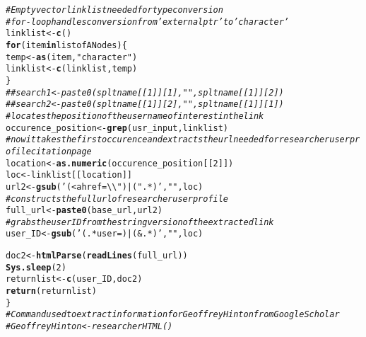 \documentclass{article}\usepackage[]{graphicx}\usepackage[]{color}
\makeatletter
\newcommand{\hlnum}[1]{\textcolor[rgb]{0.686,0.059,0.569}{#1}}%
\newcommand{\hlstr}[1]{\textcolor[rgb]{0.192,0.494,0.8}{#1}}%
\newcommand{\hlcom}[1]{\textcolor[rgb]{0.678,0.584,0.686}{\textit{#1}}}%
\newcommand{\hlstd}[1]{\textcolor[rgb]{0.345,0.345,0.345}{#1}}%
\newcommand{\hlkwa}[1]{\textcolor[rgb]{0.161,0.373,0.58}{\textbf{#1}}}%
\newcommand{\hlkwb}[1]{\textcolor[rgb]{0.69,0.353,0.396}{#1}}%
\newcommand{\hlkwd}[1]{\textcolor[rgb]{0.737,0.353,0.396}{\textbf{#1}}}%
\newenvironment{kframe}{%
 \def\at@end@of@kframe{}%
 \ifinner\ifhmode%
  \def\at@end@of@kframe{\end{minipage}}%
  \begin{minipage}{\columnwidth}%
 \fi\fi%
 \def\FrameCommand##1{\hskip\@totalleftmargin \hskip-\fboxsep
 \colorbox{shadecolor}{##1}\hskip-\fboxsep
     \hskip-\linewidth \hskip-\@totalleftmargin \hskip\columnwidth}%
 \MakeFramed {\advance\hsize-\width
   \@totalleftmargin\z@ \linewidth\hsize
   \@setminipage}}%
 {\par\unskip\endMakeFramed%
 \at@end@of@kframe}
\newenvironment{knitrout}{}{} %
\makeatother
\begin{document}
\begin{knitrout}
\begin{kframe}
\begin{alltt}
  \hlcom{#Empty vector linklist needed for type conversion}
  \hlcom{#for-loop handles conversion from 'externalptr' to 'character'}
  \hlstd{linklist}\hlkwb{<-}\hlkwd{c}\hlstd{()}
  \hlkwa{for} \hlstd{(item} \hlkwa{in} \hlstd{listofANodes) \{}
    \hlstd{temp}\hlkwb{<-}\hlkwd{as}\hlstd{(item,} \hlstr{"character"}\hlstd{)}
    \hlstd{linklist}\hlkwb{<-}\hlkwd{c}\hlstd{(linklist, temp)}
  \hlstd{\}}
  \hlcom{##search1<-paste0(spltname[[1]][1]," ",spltname[[1]][2])}
  \hlcom{##search2<-paste0(spltname[[1]][2]," ",spltname[[1]][1])}
  \hlcom{#locates the position of the user name of interest in the link}
  \hlstd{occurence_position}\hlkwb{<-}\hlkwd{grep}\hlstd{(usr_input, linklist)}
  \hlcom{#now it takes the first occurence and extracts the url needed for researcher user profile citation page}
  \hlstd{location}\hlkwb{<-}\hlkwd{as.numeric}\hlstd{(occurence_position[[}\hlnum{2}\hlstd{]])}
  \hlstd{loc}\hlkwb{<-}\hlstd{linklist[[location]]}
  \hlstd{url2}\hlkwb{<-}\hlkwd{gsub}\hlstd{(}\hlstr{'(<a href=\textbackslash{}\textbackslash{}")|(".*)'}\hlstd{,}\hlstr{""}\hlstd{,loc)}
  \hlcom{#constructs the full url of researcher user profile}
  \hlstd{full_url}\hlkwb{<-}\hlkwd{paste0}\hlstd{(base_url,url2)}
  \hlcom{#grabs the user ID from the string version of the extracted link}
  \hlstd{user_ID}\hlkwb{<-}\hlkwd{gsub}\hlstd{(}\hlstr{'(.*user=)|(&.*)'}\hlstd{,}\hlstr{""}\hlstd{,loc)}

  \hlstd{doc2}\hlkwb{<-}\hlkwd{htmlParse}\hlstd{(}\hlkwd{readLines}\hlstd{(full_url))}
  \hlkwd{Sys.sleep}\hlstd{(}\hlnum{2}\hlstd{)}
  \hlstd{returnlist}\hlkwb{<-}\hlkwd{c}\hlstd{(user_ID, doc2)}
  \hlkwd{return}\hlstd{(returnlist)}
\hlstd{\}}
\hlcom{#Command used to extract information for Geoffrey Hinton from Google Scholar}
\hlcom{#GeoffreyHinton<-researcherHTML()}
\end{alltt}
\end{kframe}
\end{knitrout}
\end{document}

